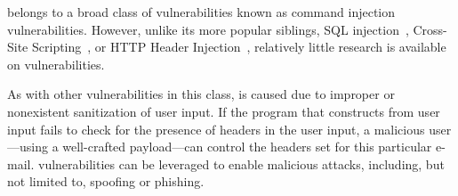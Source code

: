 \ehi belongs to a broad class of vulnerabilities known as command injection vulnerabilities. However, unlike its more popular siblings, SQL injection~\cite{sql1, sql0, sql2}, Cross-Site Scripting~\cite{Injection1, KleinAmit}, or HTTP Header Injection~\cite{sessionride}, relatively little research is available on \ehi vulnerabilities.

As with other vulnerabilities in this class, \ehi is caused due to improper or nonexistent sanitization of user input. If the program that constructs \emails from user input fails to check for the presence of \email headers in the user input, a malicious user---using a well-crafted payload---can control the headers set for this particular e-mail. \ehi vulnerabilities can be leveraged to enable malicious attacks, including, but not limited to, spoofing or phishing.

